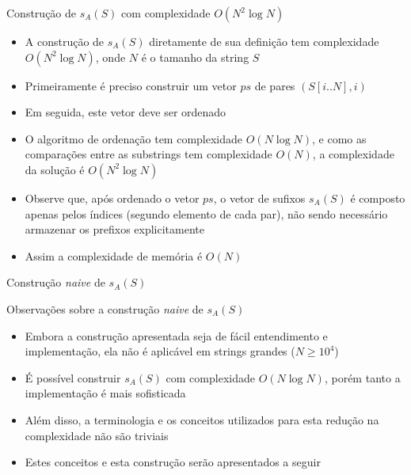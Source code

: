 \begin{frame}[fragile]{Construção de $s_A(S)$ com complexidade $O(N^2\log N)$}

    \begin{itemize}
        \item A construção de $s_A(S)$ diretamente de sua definição tem complexidade 
            $O(N^2\log N)$, onde $N$ é o tamanho da string $S$

        \item Primeiramente é preciso construir um vetor $ps$ de pares $(S[i..N], i)$

        \item Em seguida, este vetor deve ser ordenado

        \item O algoritmo de ordenação tem complexidade $O(N\log N)$, e como as comparações
            entre as substrings tem complexidade $O(N)$, a complexidade da solução é
            $O(N^2\log N)$

        \item Observe que, após ordenado o vetor $ps$, o vetor de sufixos $s_A(S)$ é composto apenas
            pelos índices (segundo elemento de cada par), não sendo necessário armazenar os
            prefixos explicitamente

        \item Assim a complexidade de memória é $O(N)$
            
    \end{itemize}

\end{frame}

\begin{frame}[fragile]{Construção {\it naive} de $s_A(S)$}
\end{frame}

\begin{frame}[fragile]{Observações sobre a construção {\it naive} de $s_A(S)$}

    \begin{itemize}
        \item Embora a construção apresentada seja de fácil entendimento e implementação,
            ela não é aplicável em strings grandes ($N \geq 10^4$)

        \item É possível construir $s_A(S)$ com complexidade $O(N\log N)$, porém tanto a 
            implementação é mais sofisticada

        \item Além disso, a terminologia e os conceitos utilizados para esta redução na 
            complexidade não são triviais

        \item Estes conceitos e esta construção serão apresentados a seguir
    \end{itemize}

\end{frame}

